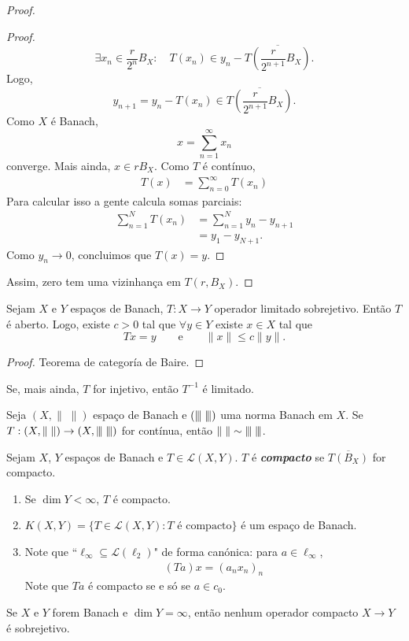 \documentclass[portuguese]{article}
\theoremstyle{definition}
\newcommand{\vertiii}[1]{{\left\vert\kern-0.25ex\left\vert\kern-0.25ex\left\vert #1 
		\right\vert\kern-0.25ex\right\vert\kern-0.25ex\right\vert}}
\begin{document}
\begin{proof}
\begin{proof}
			\[\exists x_n\in \frac{r}{2^n}B_X:\quad T(x_n)\in y_n-\overline{T\left(\frac{r}{2^{n+1}}B_X\right)}.\]
			Logo,
			\[y_{n+1}=y_n-T(x_n)\in\overline{T\left(\frac{r}{2^{n+1}}B_X\right)}.\]
			Como $X$ é Banach,
			\[x=\sum_{n=1}^\infty x_n\]
			converge. Mais ainda, $x\in rB_X$. Como $T$ é contínuo,
			\begin{align*}
				T(x)&=\sum_{n=0}^\infty T(x_n)
			\end{align*}
			Para calcular isso a gente calcula somas parciais:
			\begin{align*}
				\sum_{n=1}^NT(x_n)&=\sum_{n=1}^Ny_n-y_{n+1}\\
				&=y_1-y_{N+1}.
			\end{align*}
			Como $y_n\to 0$, concluimos que $T(x)=y$.
		\end{proof}
		Assim, zero tem uma vizinhança em $T(r,B_X)$.
	\end{proof}
	\begin{coro}
		Sejam $X$ e $Y$ espaços de Banach, $T:X\to Y$ operador limitado sobrejetivo. Então $T$ é aberto. Logo, existe $c>0$ tal que $\forall y\in Y$ existe $x\in X$ tal que
		\[Tx=y\qquad\text{e}\qquad \|x\|\leq c\|y\|.\]
	\end{coro}
	\begin{proof}
		Teorema de categoría de Baire.
	\end{proof}
	\begin{coro}
		Se, mais ainda, $T$ for injetivo, então $T^{-1}$ é limitado.
	\end{coro}
	\begin{coro}
		Seja $(X,\|\;\|)$ espaço de Banach e $(\vertiii{\;})$ uma norma Banach em $X$. Se $T:(X,\|\;\|)\to(X,\vertiii{\;})$ for contínua, então $\|\;\|\sim\vertiii{\;}$.
	\end{coro}

\begin{defn}
	Sejam $X$, $Y$ espaços de Banach e $T\in\mathcal{L}(X,Y)$. $T$ é \textbf{\textit{compacto}} se $\overline{T(B_X)}$ for compacto.
\end{defn}
\begin{exemplos}\leavevmode
	\begin{enumerate}
		\item Se $\dim Y<\infty$, $T$ é compacto.
		\item $K(X,Y)=\{T\in\mathcal{L}(X,Y):T\text{ é compacto}\}$ é um espaço de Banach.
		\item Note que ``$\ell_\infty\subseteq \mathcal{L}(\ell_2)$" de forma canónica: para $a\in\ell_\infty$,
		\begin{align*}
			(Ta)x=(a_nx_n)_n
		\end{align*}
		{\color{orange}Note que $Ta$ é compacto se e só se $a\in c_0$.}
	\end{enumerate}
\end{exemplos}
\begin{coro}
	Se $X$ e $Y$ forem Banach e $\dim Y=\infty$, então nenhum operador compacto $X\to Y$ é sobrejetivo.
\end{coro}
\end{document}

